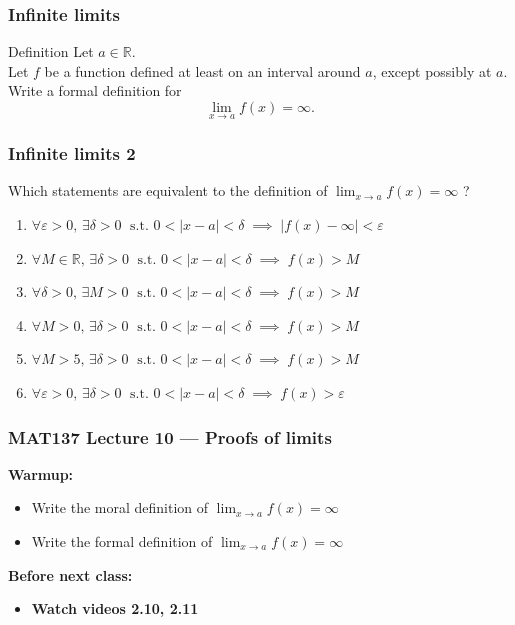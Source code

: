 \documentclass[14pt]{beamer}
\newcommand {\DS} [1] {${\displaystyle #1}$}
\newcommand {\R}{\mathbb{R}}
\begin{document}
\begin{frame}
\frametitle{Infinite limits}

\begin{block}{Definition}
Let $a \in \mathbb{R}$. \\
Let $f$ be a function defined at least on an interval around $a$, except possibly at $a$. \\
Write a formal definition for
	$$
		\lim_{x \to a} f(x) = \infty.
	$$
\end{block}

\end{frame}
\begin{frame}[t]
\frametitle{Infinite limits 2}

Which statements are equivalent to the definition of \DS{\lim_{x \to a} f(x) = \infty } ?
\vfill
\small
\begin{enumerate}
	\item \DS{\forall \varepsilon>0, \, \exists \delta > 0 \; \mbox{ s.t. } 0 < |x-a|<\delta \; \implies \; |f(x)-\infty| < \varepsilon}
	\vfill
	\item \DS{\forall M \in \R, \, \exists \delta > 0 \; \mbox{ s.t. } 0 < |x-a|<\delta \; \implies \; f(x) > M}
	\vfill
	\item \DS{\forall \delta>0, \, \exists M > 0 \; \mbox{ s.t. } 0 < |x-a|<\delta \; \implies \; f(x) > M}
	\vfill
	\item \DS{\forall M > 0, \, \exists \delta > 0 \; \mbox{ s.t. } 0 < |x-a|<\delta \; \implies \; f(x) > M}
	\vfill
	\item \DS{\forall M > 5, \, \exists \delta > 0 \; \mbox{ s.t. } 0 < |x-a|<\delta \; \implies \; f(x) > M}
	\vfill
	\item \DS{\forall \varepsilon > 0, \, \exists \delta > 0 \; \mbox{ s.t. } 0 < |x-a|<\delta \; \implies \; f(x) > \varepsilon}
\end{enumerate}

\end{frame}

\begin{frame}
\frametitle{MAT137 Lecture 10 --- Proofs of limits}
	{\bf Warmup:}

	\begin{itemize}
		\item Write the moral definition of $\displaystyle		\lim_{x\to a}f(x)=\infty $
		\item Write the formal definition of $\displaystyle		\lim_{x\to a}f(x)=\infty $
	\end{itemize}


	\vfill
	{\bf Before next class:}
		\begin{itemize} \normalsize
			\item {\bf Watch videos 2.10, 2.11 }
		\end{itemize}
	\vfill

\end{frame}
\end{document}
